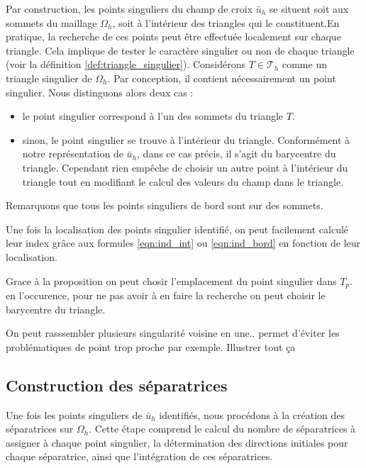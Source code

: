 Par construction, les points singuliers du champ de croix $\bar{u}_h$ se situent soit aux sommets du maillage $\Omega_h$, soit à l'intérieur des triangles qui le constituent.En pratique, la recherche de ces points peut être effectuée localement sur chaque triangle. Cela implique de tester le caractère singulier ou non de chaque triangle (voir la définition \ref{def:triangle_singulier}). Considérons $T\in\mathcal{T}_h$ comme un triangle singulier de $\Omega_h$. Par conception, il contient nécessairement un point singulier. Nous distinguons alors deux cas :\\
\begin{itemize}
 \item le point singulier correspond à l'un des sommets du triangle $T$.\\
 \item sinon, le point singulier se trouve à l'intérieur du triangle. Conformément à notre représentation de $\bar{u}_h$, dans ce cas précis, il s'agit du barycentre du triangle. Cependant rien empêche de choisir un autre point à l'intérieur du triangle tout en modifiant le calcul des valeurs du champ dans le triangle.
\end{itemize}
Remarquons que tous les points singuliers de bord sont sur des sommets.

Une fois la localisation des points singulier identifié, on peut facilement calculé leur index grâce aux formules \ref{eqn:ind_int} ou \ref{eqn:ind_bord} en fonction de leur localisation.

\begin{remark}
    Grace à la proposition on peut chosir l'emplacement du point singulier dans $T_p$. en l'occurence, pour ne pas avoir à en faire la recherche on peut choisir le barycentre du triangle.\\
\end{remark}


On peut rasssembler plusieurs singularité voisine en une.. permet d'éviter les problématiques de point trop proche par exemple.
Illustrer tout ça 

\subsection{Construction des séparatrices}

Une fois les points singuliers de $\bar{u}_h$ identifiés, nous procédons à la création des séparatrices sur $\Omega_h$. Cette étape comprend le calcul du nombre de séparatrices à assigner à chaque point singulier, la détermination des directions initiales pour chaque séparatrice, ainsi que l'intégration de ces séparatrices.

